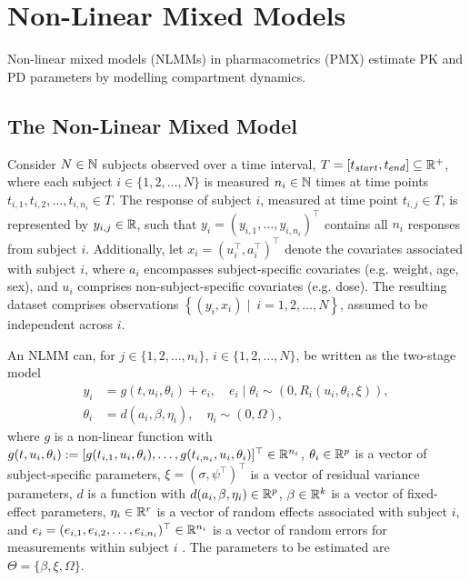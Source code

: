 \chapter{Non-Linear Mixed Models}
Non-linear mixed models (NLMMs) in pharmacometrics (PMX) estimate PK and PD parameters by modelling compartment dynamics.


\section{The Non-Linear Mixed Model} \label{sec: The Non-Linear Mixed Model}
Consider $N \in \mathbb{N}$ subjects observed over a time interval, $T=[t_{start},t_{end}] \subseteq \mathbb{R}^+$, where each subject $i \in \{1,2,\dots,N\}$ is measured $n_i \in \mathbb{N}$ times at time points $t_{i,1},t_{i,2},\dots,t_{i,n_i} \in T$. The response of subject $i$, measured at time point $t_{i,j} \in T$, is represented by $y_{i,j} \in \mathbb{R}$, such that $y_i=(y_{i,1},\dots,y_{i,n_i})^\top$ contains all $n_i$ responses from subject $i$. Additionally, let $x_i=(u_i^\top,a_i^\top)^\top$ denote the covariates associated with subject $i$, where $a_i$ encompasses subject-specific covariates (e.g. weight, age, sex), and $u_i$ comprises non-subject-specific covariates (e.g. dose). The resulting dataset comprises observations $\left\{(y_i,x_i) \mid  \ i =1,2,\dots,N\right\}$, assumed to be independent across $i$.

An NLMM can, for $j \in \{1,2,\dots,n_i\}$, $i \in \{1,2,\dots,N\}$, be written as the two-stage model
\begin{align}
    y_i &= g(t,u_i,\theta_i)+e_i, \quad e_i\mid \theta_i \sim (0,R_i(u_i,\theta_i,\xi)), \label{eq: NLME Stage 1}\\
    \theta_i &= d(a_i,\beta,\eta_i), \quad \eta_i \sim (0,\Omega)\label{eq: NLME Stage 2},
\end{align}
where $g$ is a non-linear function with $g(t,u_i,\theta_i):=[g(t_{i,1}, u_i, \theta_i),  \dots, g(t_{i,n_i}, u_i, \theta_i)]^\top \in \mathbb{R}^{n_i}$, $\theta_i \in \mathbb{R}^p$ is a vector of subject-specific parameters, $\xi=(\sigma,\psi^\top)^\top$ is a vector of residual variance parameters, $d$ is a function with $d(a_i,\beta,\eta_i) \in \mathbb{R}^p$, $\beta \in \mathbb{R}^k$ is a vector of fixed-effect parameters, $\eta_i \in \mathbb{R}^r$ is a vector of random effects associated with subject $i$, and $e_i = (e_{i,1}, e_{i,2}, \dots, e_{i,n_i})^\top \in \mathbb{R}^{n_i}$ is a vector of random errors for measurements within subject $i$ \citep[pp. 392-393]{Davidian2003}. The parameters to be estimated are $\Theta = \{\beta, \xi, \Omega\}$.

